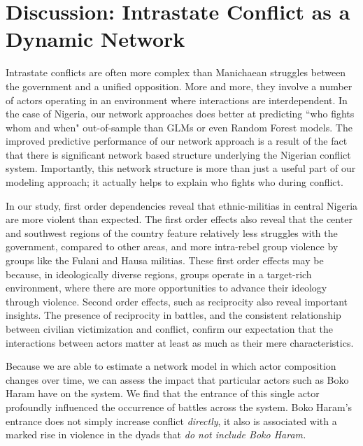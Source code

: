 \section*{Discussion: Intrastate Conflict as a Dynamic Network}

Intrastate conflicts are often more complex than Manichaean struggles between the government and a unified opposition. More and more, they involve a number of actors operating in an environment where interactions are interdependent. In the case of Nigeria, our network approaches does better at predicting ``who fights whom and when" out-of-sample than GLMs or even Random Forest models. The improved predictive performance of our network approach is a result of the fact that there is significant network based structure underlying the Nigerian conflict system. Importantly, this network structure is more than just a useful part of our modeling approach; it actually helps to explain who fights who during conflict. 

In our study, first order dependencies reveal that ethnic-militias in central Nigeria are more violent than expected. The first order effects also reveal that the center and southwest regions of the country feature relatively less struggles with the government, compared to other areas, and more intra-rebel group violence by groups like the Fulani and Hausa militias. These first order effects may be because, in ideologically diverse regions, groups operate in a target-rich environment, where there are more opportunities to advance their ideology through violence. Second order effects, such as reciprocity also reveal important insights. The presence of reciprocity in battles, and the consistent relationship between civilian victimization and conflict, confirm our expectation that the interactions between actors matter at least as much as their mere characteristics.

Because we are able to estimate a network model in which actor composition changes over time, we can assess the impact that particular actors such as Boko Haram have on the system. We find that the entrance of this single actor profoundly influenced the occurrence of battles across the system. Boko Haram's entrance does not simply increase conflict \emph{directly}, it also is associated with a marked rise in violence in the dyads that \emph{do not include Boko Haram.} 

